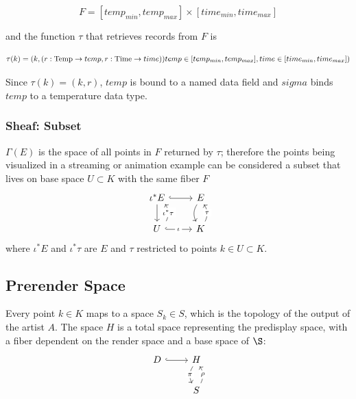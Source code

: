 \documentclass[../main.tex]{subfiles}
\begin{document}
\begin{equation}
F = [temp_{min}, temp_{max}] \times [time_{min}, time_{max}]
\end{equation}

and the function $\tau$ that retrieves records from $F$ is

\begin{equation}
\tau(k) =(k, (r: \textrm{Temp}\rightarrow temp, r: \textrm{Time}\rightarrow time))\\
temp \in [temp_{min}, temp_{max}], time \in [time_{min}, time_{max}])
\end{equation}

Since $\tau(k)=(k, r)$, $temp$ is bound to a named data field and $sigma$ binds $temp$ to a temperature data type. 

\subsubsection{Sheaf: Subset}

$\Gamma(E)$ is the space of all points in $F$ returned by $\tau$; therefore the points being visualized in a streaming or animation example can be considered a subset that lives on base space $U \subset K$ with the same fiber $F$
\begin{equation}
    \begin{tikzcd}
        \iota^\ast E \arrow[r, hook] \arrow[d]                                                                       & E \arrow[d, bend right]                       \\
        U \arrow[r, "\iota" description, hook] \arrow[u, "\iota^\ast \tau" description, bend right, shift right=2] & K \arrow[u, "\tau" description, bend right]
    \end{tikzcd}    
\end{equation}
where $\iota^*E$ and $\iota^*\tau$ are $E$ and $\tau$ restricted to points $k \in U \subset K$.   


\subsection{Prerender Space}
\label{sec:display}

Every point $k \in K$ maps to a space $S_{k} \in S$, which is the topology of the output of the artist $A$. The space $H$ is a total space representing the predisplay space, with a fiber dependent on the render space and a base space of $\S$:
\begin{equation}
    \begin{tikzcd}
        D \arrow[r, hook] & H \arrow[d, "\pi" description, bend right] \\
                                    & S \arrow[u, "\rho" description, bend right] 
    \end{tikzcd}
\end{equation}
\end{document}
